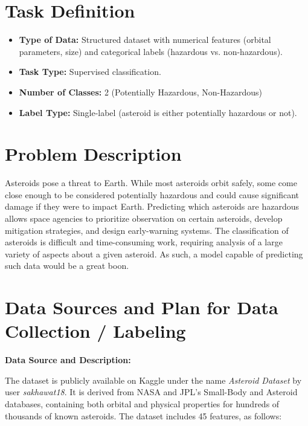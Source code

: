 \documentclass{article}
\begin{document}
\section{Task Definition}
\begin{itemize}
    \item \textbf{Type of Data:} Structured dataset with numerical features (orbital parameters, size) and categorical labels (hazardous vs. non-hazardous).
    \item \textbf{Task Type:} Supervised classification.
    \item \textbf{Number of Classes:} 2 (Potentially Hazardous, Non-Hazardous)
    \item \textbf{Label Type:} Single-label (asteroid is either potentially hazardous or not).
\end{itemize}

\section{Problem Description}
Asteroids pose a threat to Earth.
While most asteroids orbit safely, some come close enough to be considered potentially hazardous and could cause significant damage if they were to impact Earth.
Predicting which asteroids are hazardous allows space agencies to prioritize observation on certain asteroids, develop mitigation strategies, and design early-warning systems.
The classification of asteroids is difficult and time-consuming work, requiring analysis of a large variety of aspects about a given asteroid.
As such, a model capable of predicting such data would be a great boon.

\section{Data Sources and Plan for Data Collection / Labeling}

\textbf{Data Source and Description:}

The dataset is publicly available on Kaggle under the name \textit{Asteroid Dataset} by user \textit{sakhawat18}.
It is derived from NASA and JPL’s Small-Body and Asteroid databases, containing both orbital and physical properties for hundreds of thousands of known asteroids.
The dataset includes 45 features, as follows:
\end{document}

